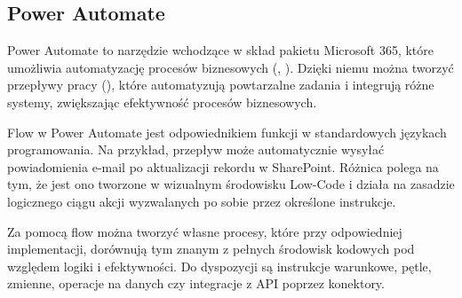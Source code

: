 \subsection{Power Automate}
Power Automate to narzędzie wchodzące w skład pakietu Microsoft 365, które umożliwia automatyzację procesów biznesowych (, ). Dzięki niemu można tworzyć przepływy pracy (), które automatyzują powtarzalne zadania i integrują różne systemy, zwiększając efektywność procesów biznesowych.

Flow w Power Automate jest odpowiednikiem funkcji w standardowych językach programowania. Na przykład, przepływ może automatycznie wysyłać powiadomienia e-mail po aktualizacji rekordu w SharePoint. Różnica polega na tym, że jest ono tworzone w wizualnym środowisku Low-Code i działa na zasadzie logicznego ciągu akcji wyzwalanych po sobie przez określone instrukcje.

Za pomocą flow można tworzyć własne procesy, które przy odpowiedniej implementacji, dorównują tym znanym z pełnych środowisk kodowych pod względem logiki i efektywności. Do dyspozycji są instrukcje warunkowe, pętle, zmienne, operacje na danych czy integracje z API poprzez konektory.
